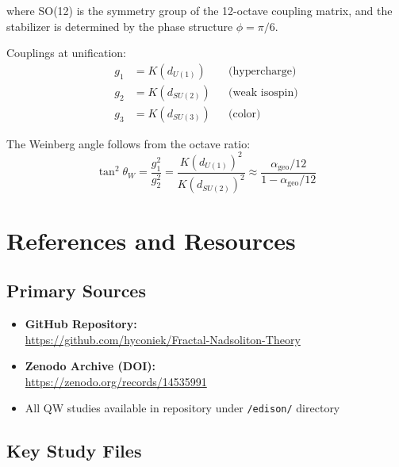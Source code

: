 \documentclass[11pt, a4paper]{article}
\theoremstyle{remark}
\newcommand{\alphageo}{\alpha_{\text{geo}}}
\begin{document}
where SO(12) is the symmetry group of the 12-octave coupling matrix, and the stabilizer is determined by the phase structure $\phi = \pi/6$.

Couplings at unification:
\begin{align}
g_1 &= K(d_{U(1)}) &&\text{(hypercharge)} \\
g_2 &= K(d_{SU(2)}) &&\text{(weak isospin)} \\
g_3 &= K(d_{SU(3)}) &&\text{(color)}
\end{align}

The Weinberg angle follows from the octave ratio:
\begin{equation}
\tan^2\theta_W = \frac{g_1^2}{g_2^2} = \frac{K(d_{U(1)})^2}{K(d_{SU(2)})^2} \approx \frac{\alphageo/12}{1 - \alphageo/12}
\end{equation}

\section{References and Resources}

\subsection{Primary Sources}

\begin{itemize}
    \item \textbf{GitHub Repository:} \\
    \url{https://github.com/hyconiek/Fractal-Nadsoliton-Theory}
    
    \item \textbf{Zenodo Archive (DOI):} \\
    \url{https://zenodo.org/records/14535991}
    
    \item All QW studies available in repository under \texttt{/edison/} directory
\end{itemize}

\subsection{Key Study Files}
\end{document}
